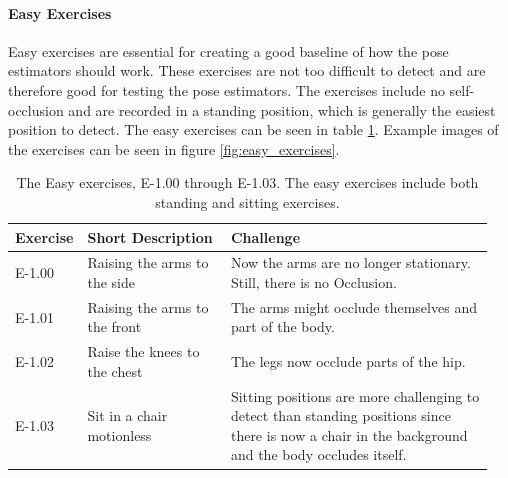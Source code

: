 \paragraph{Easy Exercises}

Easy exercises are essential for creating a good baseline of how the pose estimators should work. These exercises are not too difficult to detect and are therefore good for testing the pose estimators. The exercises include no self-occlusion and are recorded in a standing position, which is generally the easiest position to detect. The easy exercises can be seen in table \ref{tab:easy_exercises}. Example images of the exercises can be seen in figure \ref{fig:easy_exercises}.

\begin{table}[]
  \caption[Easy Exercises]{The Easy exercises, E-1.00 through E-1.03. The easy exercises include both standing and sitting exercises.}
  \label{tab:easy_exercises}
  \begin{tabular}{p{0.1\linewidth}p{0.3\linewidth}p{0.55\linewidth}}
  \hline
  Exercise & Short Description             & Challenge                                                                                                                                                                                           \\ \hline
  E-1.00   & Raising the arms to the side  & Now the arms are no longer stationary. Still, there is no Occlusion. \\
  E-1.01   & Raising the arms to the front & The arms might occlude themselves and part of the body.  \\
  E-1.02   & Raise the knees to the chest  & The legs now occlude parts of the hip.  \\
  E-1.03   & Sit in a chair motionless     & Sitting positions are more challenging to detect than standing positions since there is now a chair in the background and the body occludes itself.\\ \hline
  \end{tabular}
  \end{table}


